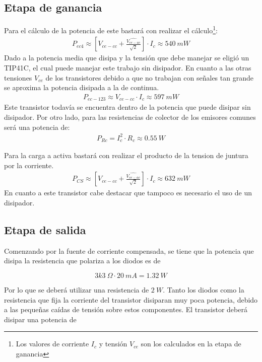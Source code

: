 \subsection{Etapa de ganancia}
Para el cálculo de la potencia de este bastará con realizar el cálculo\footnote{Los valores de corriente $I_c$ y tensión $V_{ce}$ son los calculados en la etapa de ganancia}:
\begin{align}
P_{ec4}\approx\left[V_{ce-cc} + \frac{\hat{V_{ce-ac}}}{\sqrt{2}}\right]\cdot I_c\approx 540 \ mW
\end{align}
Dado a la potencia media que disipa y la tensión que debe manejar se eligió un TIP41C, el cual puede manejar este trabajo sin disipador.
En cuanto a las otras tensiones $V_{ce}$ de los transistores debido a que no trabajan con señales tan grande se aproxima la potencia disipada a la de continua.
\begin{align}
P_{ec-123}\approx V_{ce-cc} \cdot I_c \approx 597 \ mW
\end{align}
Este transistor todavía se encuentra dentro de la potencia que puede disipar sin disipador.
Por otro lado, para las resistencias de colector de los emisores comunes será una potencia de:
\begin{align}
P_{Rc}= I_c^2 \cdot R_c \approx 0.55 \ W
\end{align}

Para la carga a activa bastará con realizar el producto de la tension de juntura por la corriente.
\begin{align}
P_{CS}\approx\left[V_{ce-cc} + \frac{\hat{V_{ce-ac}}}{\sqrt{2}}\right]\cdot I_c\approx  632\ mW
\end{align}
En cuanto a este transistor cabe destacar que tampoco es necesario el uso de un disipador.
\subsection{Etapa de salida}

Comenzando por la fuente de corriente compensada, se tiene que la potencia que disipa la resistencia que polariza a los diodos es de

\begin{equation}
3k3 \ \Omega \cdot 20 \ mA = 1.32 \ W
\end{equation}

Por lo que se deberá utilizar una resistencia de $2 \ W$. Tanto los diodos como la resistencia que fija la corriente del transistor disiparan muy poca potencia, debido a las pequeñas caídas de tensión sobre estos componentes. El transistor deberá disipar una potencia de

